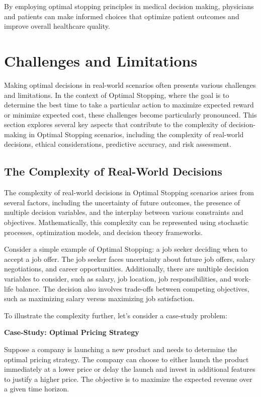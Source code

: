 \documentclass[12pt]{book} %
\begin{document}
By employing optimal stopping principles in medical decision making, physicians and patients can make informed choices that optimize patient outcomes and improve overall healthcare quality.



\section{Challenges and Limitations}

Making optimal decisions in real-world scenarios often presents various challenges and limitations. In the context of Optimal Stopping, where the goal is to determine the best time to take a particular action to maximize expected reward or minimize expected cost, these challenges become particularly pronounced. This section explores several key aspects that contribute to the complexity of decision-making in Optimal Stopping scenarios, including the complexity of real-world decisions, ethical considerations, predictive accuracy, and risk assessment.

\subsection{The Complexity of Real-World Decisions}

The complexity of real-world decisions in Optimal Stopping scenarios arises from several factors, including the uncertainty of future outcomes, the presence of multiple decision variables, and the interplay between various constraints and objectives. Mathematically, this complexity can be represented using stochastic processes, optimization models, and decision theory frameworks.

Consider a simple example of Optimal Stopping: a job seeker deciding when to accept a job offer. The job seeker faces uncertainty about future job offers, salary negotiations, and career opportunities. Additionally, there are multiple decision variables to consider, such as salary, job location, job responsibilities, and work-life balance. The decision also involves trade-offs between competing objectives, such as maximizing salary versus maximizing job satisfaction.

To illustrate the complexity further, let's consider a case-study problem:

\textbf{Case-Study: Optimal Pricing Strategy}

Suppose a company is launching a new product and needs to determine the optimal pricing strategy. The company can choose to either launch the product immediately at a lower price or delay the launch and invest in additional features to justify a higher price. The objective is to maximize the expected revenue over a given time horizon.
\end{document}
